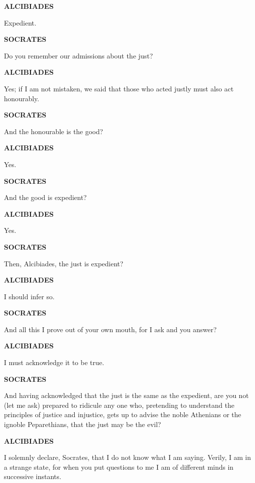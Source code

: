 \documentclass[11pt,letter]{article}
\begin{document}
\par \textbf{ALCIBIADES}
\par   Expedient.

\par \textbf{SOCRATES}
\par   Do you remember our admissions about the just?

\par \textbf{ALCIBIADES}
\par   Yes; if I am not mistaken, we said that those who acted justly must also act honourably.

\par \textbf{SOCRATES}
\par   And the honourable is the good?

\par \textbf{ALCIBIADES}
\par   Yes.

\par \textbf{SOCRATES}
\par   And the good is expedient?

\par \textbf{ALCIBIADES}
\par   Yes.

\par \textbf{SOCRATES}
\par   Then, Alcibiades, the just is expedient?

\par \textbf{ALCIBIADES}
\par   I should infer so.

\par \textbf{SOCRATES}
\par   And all this I prove out of your own mouth, for I ask and you answer?

\par \textbf{ALCIBIADES}
\par   I must acknowledge it to be true.

\par \textbf{SOCRATES}
\par   And having acknowledged that the just is the same as the expedient, are you not (let me ask) prepared to ridicule any one who, pretending to understand the principles of justice and injustice, gets up to advise the noble Athenians or the ignoble Peparethians, that the just may be the evil?

\par \textbf{ALCIBIADES}
\par   I solemnly declare, Socrates, that I do not know what I am saying. Verily, I am in a strange state, for when you put questions to me I am of different minds in successive instants.
\end{document}
